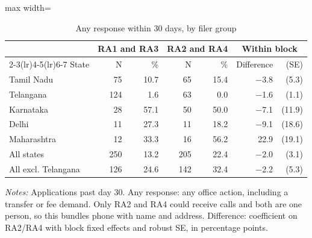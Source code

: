 \begin{table}[!htbp]
\centering
\caption{Any response within 30 days, by filer group}
\label{tab:tab_filer}
\small
\begin{adjustbox}{max width=\textwidth}
\begin{threeparttable}
\begin{tabular}{lrrrrrr}
\toprule
& \multicolumn{2}{c}{RA1 and RA3} & \multicolumn{2}{c}{RA2 and RA4} & \multicolumn{2}{c}{Within block} \\ \cmidrule(lr){2-3}\cmidrule(lr){4-5}\cmidrule(lr){6-7} State & N & \% & N & \% & Difference & (SE) \\
\midrule
Tamil Nadu & 75 & 10.7 & 65 & 15.4 & $-$3.8 & (5.3) \\
Telangana & 124 & 1.6 & 63 & 0.0 & $-$1.6 & (1.1) \\
Karnataka & 28 & 57.1 & 50 & 50.0 & $-$7.1 & (11.9) \\
Delhi & 11 & 27.3 & 11 & 18.2 & $-$9.1 & (18.6) \\
Maharashtra & 12 & 33.3 & 16 & 56.2 & 22.9 & (19.1) \\
\midrule
All states & 250 & 13.2 & 205 & 22.4 & $-$2.0 & (3.1) \\
All excl. Telangana & 126 & 24.6 & 142 & 32.4 & $-$2.2 & (5.3) \\
\bottomrule
\end{tabular}
\begin{tablenotes}[flushleft]\footnotesize
\item \textit{Notes:} Applications past day 30. Any response: any office action, including a transfer or fee demand. Only RA2 and RA4 could receive calls and both are one person, so this bundles phone with name and address. Difference: coefficient on RA2/RA4 with block fixed effects and robust SE, in percentage points.
\end{tablenotes}
\end{threeparttable}
\end{adjustbox}
\end{table}
